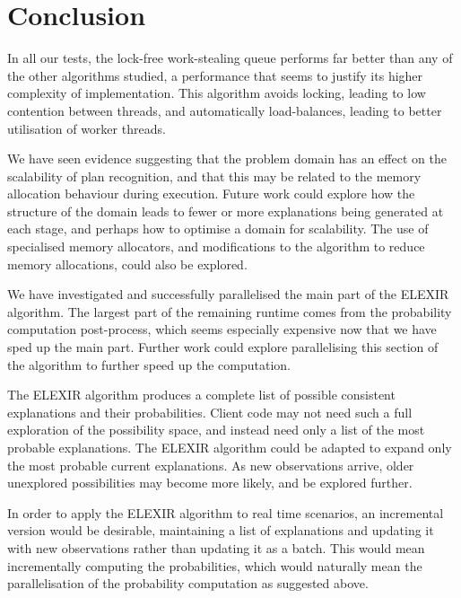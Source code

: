 \chapter{Conclusion}

In all our tests, the lock-free work-stealing queue performs far better than any of the other algorithms studied, a performance that seems to justify its higher complexity of implementation. This algorithm avoids locking, leading to low contention between threads, and automatically load-balances, leading to better utilisation of worker threads.

We have seen evidence suggesting that the problem domain has an effect on the scalability of plan recognition, and that this may be related to the memory allocation behaviour during execution. Future work could explore how the structure of the domain leads to fewer or more explanations being generated at each stage, and perhaps how to optimise a domain for scalability. The use of specialised memory allocators, and modifications to the algorithm to reduce memory allocations, could also be explored.

We have investigated and successfully parallelised the main part of the ELEXIR algorithm. The largest part of the remaining runtime comes from the probability computation post-process, which seems especially expensive now that we have sped up the main part. Further work could explore parallelising this section of the algorithm to further speed up the computation.

The ELEXIR algorithm produces a complete list of possible consistent explanations and their probabilities. Client code may not need such a full exploration of the possibility space, and instead need only a list of the most probable explanations. The ELEXIR algorithm could be adapted to expand only the most probable current explanations. As new observations arrive, older unexplored possibilities may become more likely, and be explored further.

In order to apply the ELEXIR algorithm to real time scenarios, an incremental version would be desirable, maintaining a list of explanations and updating it with new observations rather than updating it as a batch. This would mean incrementally computing the probabilities, which would naturally mean the parallelisation of the probability computation as suggested above.